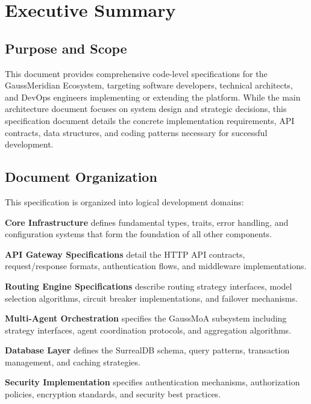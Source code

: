 \documentclass[12pt,a4paper,twoside]{report}
\begin{document}

\chapter*{Executive Summary}

\section*{Purpose and Scope}

This document provides comprehensive code-level specifications for the GaussMeridian Ecosystem, targeting software developers, technical architects, and DevOps engineers implementing or extending the platform. While the main architecture document focuses on system design and strategic decisions, this specification document details the concrete implementation requirements, API contracts, data structures, and coding patterns necessary for successful development.

\section*{Document Organization}

This specification is organized into logical development domains:

\textbf{Core Infrastructure} defines fundamental types, traits, error handling, and configuration systems that form the foundation of all other components.

\textbf{API Gateway Specifications} detail the HTTP API contracts, request/response formats, authentication flows, and middleware implementations.

\textbf{Routing Engine Specifications} describe routing strategy interfaces, model selection algorithms, circuit breaker implementations, and failover mechanisms.

\textbf{Multi-Agent Orchestration} specifies the GaussMoA subsystem including strategy interfaces, agent coordination protocols, and aggregation algorithms.

\textbf{Database Layer} defines the SurrealDB schema, query patterns, transaction management, and caching strategies.

\textbf{Security Implementation} specifies authentication mechanisms, authorization policies, encryption standards, and security best practices.
\end{document}
